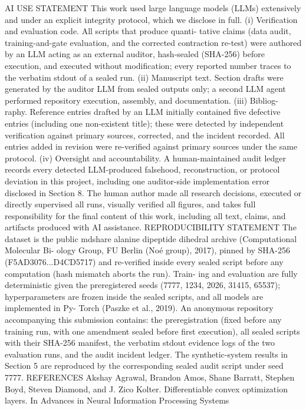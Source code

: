 \documentclass{article}
\begin{document}
AI USE STATEMENT
This work used large language models (LLMs) extensively and under an explicit integrity protocol,
which we disclose in full. (i) Verification and evaluation code. All scripts that produce quanti-
tative claims (data audit, training-and-gate evaluation, and the corrected contraction re-test) were
authored by an LLM acting as an external auditor, hash-sealed (SHA-256) before execution, and
executed without modification; every reported number traces to the verbatim stdout of a sealed run.
(ii) Manuscript text. Section drafts were generated by the auditor LLM from sealed outputs only;
a second LLM agent performed repository execution, assembly, and documentation. (iii) Bibliog-
raphy. Reference entries drafted by an LLM initially contained five defective entries (including
one non-existent title); these were detected by independent verification against primary sources,
corrected, and the incident recorded. All entries added in revision were re-verified against primary
sources under the same protocol. (iv) Oversight and accountability. A human-maintained audit
ledger records every detected LLM-produced falsehood, reconstruction, or protocol deviation in this
project, including one auditor-side implementation error disclosed in Section 8. The human author
made all research decisions, executed or directly supervised all runs, visually verified all figures,
and takes full responsibility for the final content of this work, including all text, claims, and artifacts
produced with AI assistance.
REPRODUCIBILITY STATEMENT
The dataset is the public mdshare alanine dipeptide dihedral archive (Computational Molecular Bi-
ology Group, FU Berlin (No\'e group), 2017), pinned by SHA-256 (F5AD3076...D4CD5717) and
re-verified inside every sealed script before any computation (hash mismatch aborts the run). Train-
ing and evaluation are fully deterministic given the preregistered seeds (7777, 1234, 2026, 31415,
65537); hyperparameters are frozen inside the sealed scripts, and all models are implemented in Py-
Torch (Paszke et al., 2019). An anonymous repository accompanying this submission contains: the
preregistration (fixed before any training run, with one amendment sealed before first execution), all
sealed scripts with their SHA-256 manifest, the verbatim stdout evidence logs of the two evaluation
runs, and the audit incident ledger. The synthetic-system results in Section 5 are reproduced by the
corresponding sealed audit script under seed 7777.
REFERENCES
Akshay Agrawal, Brandon Amos, Shane Barratt, Stephen Boyd, Steven Diamond, and J. Zico Kolter.
Differentiable convex optimization layers. In Advances in Neural Information Processing Systems
\end{document}
